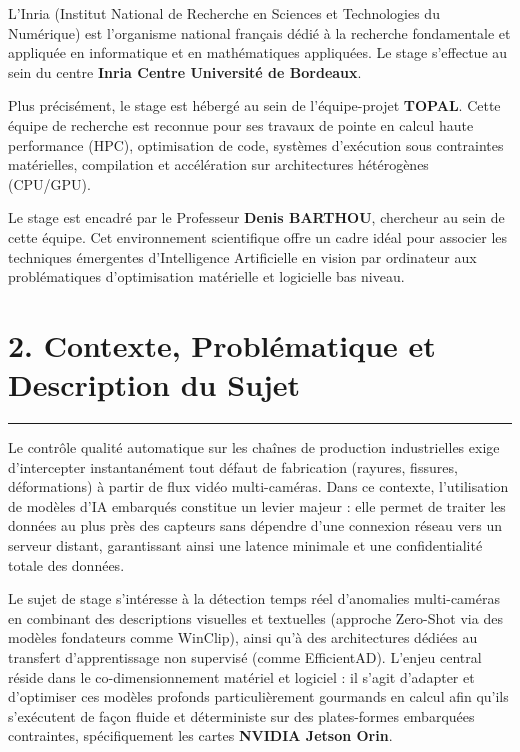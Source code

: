 \documentclass[11pt,a4paper]{article}
\begin{document}
L'Inria (Institut National de Recherche en Sciences et Technologies du Numérique) est l'organisme national français dédié à la recherche fondamentale et appliquée en informatique et en mathématiques appliquées. Le stage s'effectue au sein du centre \textbf{Inria Centre Université de Bordeaux}.

Plus précisément, le stage est hébergé au sein de l'équipe-projet \textbf{TOPAL}. Cette équipe de recherche est reconnue pour ses travaux de pointe en calcul haute performance (HPC), optimisation de code, systèmes d'exécution sous contraintes matérielles, compilation et accélération sur architectures hétérogènes (CPU/GPU). 

Le stage est encadré par le Professeur \textbf{Denis BARTHOU}, chercheur au sein de cette équipe. Cet environnement scientifique offre un cadre idéal pour associer les techniques émergentes d'Intelligence Artificielle en vision par ordinateur aux problématiques d'optimisation matérielle et logicielle bas niveau.

\section*{\color{darkBlue} 2. Contexte, Problématique et Description du Sujet}
\hrule
\vspace{0.2cm}

Le contrôle qualité automatique sur les chaînes de production industrielles exige d'intercepter instantanément tout défaut de fabrication (rayures, fissures, déformations) à partir de flux vidéo multi-caméras. Dans ce contexte, l'utilisation de modèles d'IA embarqués constitue un levier majeur : elle permet de traiter les données au plus près des capteurs sans dépendre d'une connexion réseau vers un serveur distant, garantissant ainsi une latence minimale et une confidentialité totale des données.

Le sujet de stage s'intéresse à la détection temps réel d'anomalies multi-caméras en combinant des descriptions visuelles et textuelles (approche Zero-Shot via des modèles fondateurs comme WinClip), ainsi qu'à des architectures dédiées au transfert d'apprentissage non supervisé (comme EfficientAD). L'enjeu central réside dans le co-dimensionnement matériel et logiciel : il s'agit d'adapter et d'optimiser ces modèles profonds particulièrement gourmands en calcul afin qu'ils s'exécutent de façon fluide et déterministe sur des plates-formes embarquées contraintes, spécifiquement les cartes \textbf{NVIDIA Jetson Orin}.
\end{document}
